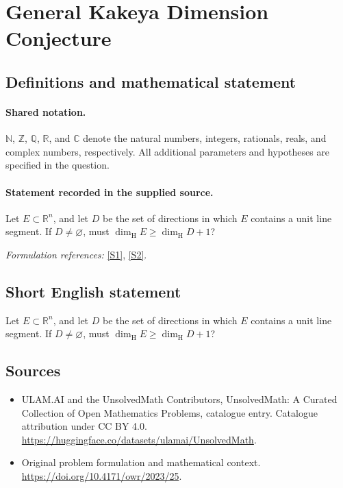 \documentclass[11pt]{article}
\newcommand{\sref}[2]{\hyperlink{source:#1:#2}{[S#2]}}
\begin{document}
\section{General Kakeya Dimension Conjecture}\label{statement}

\subsection{Definitions and mathematical statement}

\paragraph{Shared notation.}$\mathbb N$, $\mathbb Z$, $\mathbb Q$, $\mathbb R$, and $\mathbb C$ denote the natural numbers, integers, rationals, reals, and complex numbers, respectively. All additional parameters and hypotheses are specified in the question.


\paragraph{Statement recorded in the supplied source.}
Let $E\subset\mathbb R^n$, and let $D$ be the set of directions in which $E$ contains a unit line segment. If $D\neq\varnothing$, must $\dim_{\mathrm H}E\geq\dim_{\mathrm H}D+1$?
\par\smallskip\textit{Formulation references:} \sref{statement}{1}, \sref{statement}{2}.
\subsection{Short English statement}
Let $E\subset\mathbb R^n$, and let $D$ be the set of directions in which $E$ contains a unit line segment. If $D\neq\varnothing$, must $\dim_{\mathrm H}E\geq\dim_{\mathrm H}D+1$?
\subsection{Sources}
\begin{itemize}
\item[\hypertarget{source:statement:1}{S1}] ULAM.AI and the UnsolvedMath Contributors, UnsolvedMath: A Curated Collection of Open Mathematics Problems, catalogue entry. Catalogue attribution under CC BY 4.0.
\url{https://huggingface.co/datasets/ulamai/UnsolvedMath}.
\item[\hypertarget{source:statement:2}{S2}] Original problem formulation and mathematical context.
\url{https://doi.org/10.4171/owr/2023/25}.
\end{itemize}
\label{end:statement}
\end{document}
